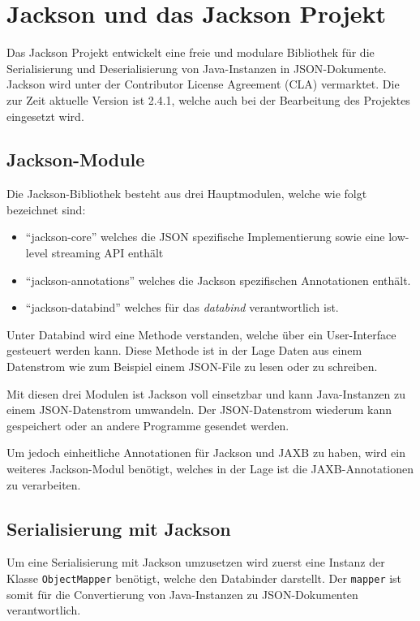 \section{Jackson und das Jackson Projekt}
Das Jackson Projekt entwickelt eine freie und modulare Bibliothek f\"ur die Serialisierung und Deserialisierung von Java-Instanzen in \ac{JSON}-Dokumente. Jackson wird unter der Contributor License Agreement (CLA) vermarktet. Die zur Zeit aktuelle Version ist 2.4.1, welche auch bei der Bearbeitung des Projektes eingesetzt wird.

\subsection{Jackson-Module}
Die Jackson-Bibliothek besteht aus drei Hauptmodulen, welche wie folgt bezeichnet sind:
\begin{itemize}
 \item "`jackson-core"' welches die JSON spezifische Implementierung sowie eine low-level streaming API enth\"alt
 \item "`jackson-annotations"' welches die Jackson spezifischen Annotationen enth\"alt.
 \item "`jackson-databind"' welches f\"ur das \textit{databind} verantwortlich ist.
\end{itemize}
Unter Databind wird eine Methode verstanden, welche \"uber ein User-Interface gesteuert werden kann.
Diese Methode ist in der Lage Daten aus einem Datenstrom wie zum Beispiel einem JSON-File zu lesen oder zu schreiben.

Mit diesen drei Modulen ist Jackson voll einsetzbar und kann Java-Instanzen zu einem JSON-Datenstrom umwandeln. Der JSON-Datenstrom wiederum kann gespeichert oder an andere Programme gesendet werden.

Um jedoch einheitliche Annotationen f\"ur Jackson und JAXB zu haben, wird ein weiteres Jackson-Modul ben\"otigt, welches in der Lage ist die JAXB-Annotationen zu verarbeiten.\cite{Jackson}

\subsection{Serialisierung mit Jackson}\label{Serialisierung}
Um eine Serialisierung mit Jackson umzusetzen wird zuerst eine Instanz der Klasse \texttt{ObjectMapper} ben\"otigt, welche den Databinder darstellt. Der \texttt{mapper} ist somit f\"ur die Convertierung von Java-Instanzen zu JSON-Dokumenten verantwortlich. 

